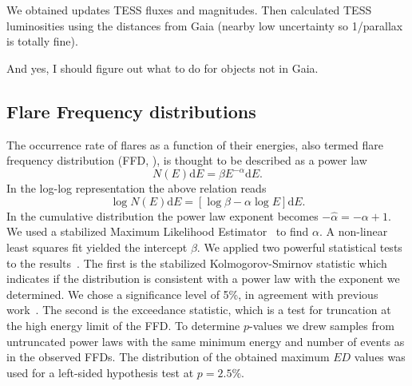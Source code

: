\documentclass{aastex62}
\begin{document}
We obtained updates TESS fluxes and magnitudes. Then calculated TESS luminosities using the distances from Gaia (nearby low uncertainty so 1/parallax is totally fine). 

And yes, I should figure out what to do for objects not in Gaia. 

\subsection{Flare Frequency distributions} \label{subsec:FFD}
The occurrence rate of flares as a function of their energies, also termed flare frequency distribution (FFD, \cite{lacy1976}), is thought to be described as a power law
\begin{equation}
N(E)\mathrm{d}E = \beta E^{-\alpha}\mathrm{d}E.
\end{equation}
In the log-log representation the above relation reads
\begin{equation}
\log N(E) \mathrm{d}E = [\log\beta -\alpha\log E] \mathrm{d}E.
\end{equation}
In the cumulative distribution the power law exponent becomes $-\hat{\alpha} = -\alpha +1$. 
We used a stabilized Maximum Likelihood Estimator~\citep{maschberger2009} to find $\alpha$. A non-linear least squares fit yielded the intercept $\beta$. We applied two powerful statistical tests to the results~\citep{maschberger2009}. The first is the stabilized Kolmogorov-Smirnov statistic which indicates if the distribution is consistent with a power law with the exponent we determined. We chose a significance level of 5\%, in agreement with previous work~\citep{loyd2018}. The second is the exceedance statistic, which is a test for truncation at the high energy limit of the FFD. To determine $p$-values we drew samples from untruncated power laws with the same minimum energy and number of events as in the observed FFDs. The distribution of the obtained maximum $ED$ values was used for a left-sided hypothesis test at $p=2.5\%$. 
\\
\end{document}
